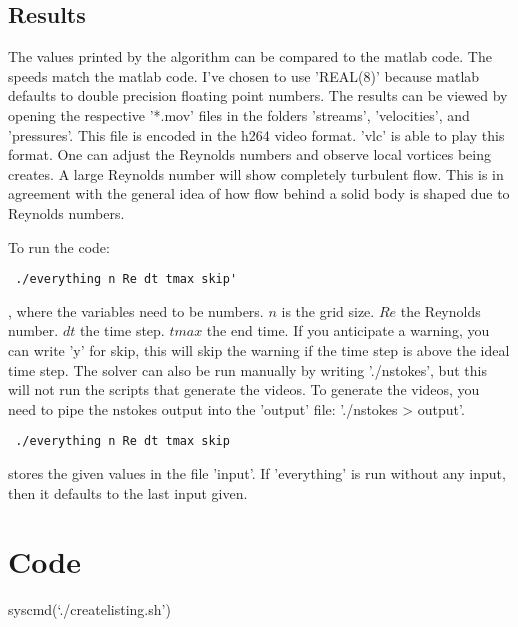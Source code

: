 \documentclass[listof=totoc]{report}
\begin{document}
\section{Results}
The values printed by the algorithm can be compared to the matlab code. The speeds match the matlab code. I've chosen to use 'REAL(8)' because matlab defaults to double precision floating point numbers. The results can be viewed by opening the respective '*.mov' files in the folders 'streams', 'velocities', and 'pressures'. This file is encoded in the h264 video format. 'vlc' is able to play this format. One can adjust the Reynolds numbers and observe local vortices being creates. A large Reynolds number will show completely turbulent flow. This is in agreement with the general idea of how flow behind a solid body is shaped due to Reynolds numbers.

To run the code:
\begin{verbatim} ./everything n Re dt tmax skip' \end{verbatim}, where the variables need to be numbers. $n$ is the grid size. $Re$ the Reynolds number. $dt$ the time step. $tmax$ the end time. If you anticipate a warning, you can write 'y' for skip, this will skip the warning if the time step is above the ideal time step. The solver can also be run manually by writing './nstokes', but this will not run the scripts that generate the videos. To generate the videos, you need to pipe the nstokes output into the 'output' file: './nstokes > output'.

\begin{verbatim} ./everything n Re dt tmax skip \end{verbatim} stores the given values in the file 'input'. If 'everything' is run without any input, then it defaults to the last input given.

\chapter{Code}
syscmd(`./createlisting.sh')
\end{document}

